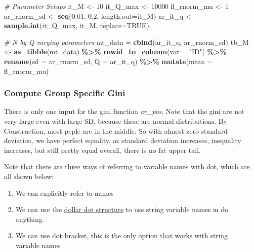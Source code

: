 \documentclass[
]{book}
\newenvironment{Shaded}{\begin{snugshade}}{\end{snugshade}}
\newcommand{\CommentTok}[1]{\textcolor[rgb]{0.56,0.35,0.01}{\textit{#1}}}
\newcommand{\DataTypeTok}[1]{\textcolor[rgb]{0.13,0.29,0.53}{#1}}
\newcommand{\DecValTok}[1]{\textcolor[rgb]{0.00,0.00,0.81}{#1}}
\newcommand{\FloatTok}[1]{\textcolor[rgb]{0.00,0.00,0.81}{#1}}
\newcommand{\KeywordTok}[1]{\textcolor[rgb]{0.13,0.29,0.53}{\textbf{#1}}}
\newcommand{\NormalTok}[1]{#1}
\newcommand{\OperatorTok}[1]{\textcolor[rgb]{0.81,0.36,0.00}{\textbf{#1}}}
\newcommand{\OtherTok}[1]{\textcolor[rgb]{0.56,0.35,0.01}{#1}}
\newcommand{\StringTok}[1]{\textcolor[rgb]{0.31,0.60,0.02}{#1}}
\providecommand{\tightlist}{%
  \setlength{\itemsep}{0pt}\setlength{\parskip}{0pt}}
\begin{document}
\begin{Shaded}
\begin{Highlighting}[]
\CommentTok{\# Parameter Setups}
\NormalTok{it\_M \textless{}{-}}\StringTok{ }\DecValTok{10}
\NormalTok{it\_Q\_max \textless{}{-}}\StringTok{ }\DecValTok{10000}
\NormalTok{fl\_rnorm\_mu \textless{}{-}}\StringTok{ }\DecValTok{1}
\NormalTok{ar\_rnorm\_sd \textless{}{-}}\StringTok{ }\KeywordTok{seq}\NormalTok{(}\FloatTok{0.01}\NormalTok{, }\FloatTok{0.2}\NormalTok{, }\DataTypeTok{length.out=}\NormalTok{it\_M)}
\NormalTok{ar\_it\_q \textless{}{-}}\StringTok{ }\KeywordTok{sample.int}\NormalTok{(it\_Q\_max, it\_M, }\DataTypeTok{replace=}\OtherTok{TRUE}\NormalTok{)}

\CommentTok{\# N by Q varying parameters}
\NormalTok{mt\_data =}\StringTok{ }\KeywordTok{cbind}\NormalTok{(ar\_it\_q, ar\_rnorm\_sd)}
\NormalTok{tb\_M \textless{}{-}}\StringTok{ }\KeywordTok{as\_tibble}\NormalTok{(mt\_data) }\OperatorTok{\%\textgreater{}\%}\StringTok{ }\KeywordTok{rowid\_to\_column}\NormalTok{(}\DataTypeTok{var =} \StringTok{"ID"}\NormalTok{) }\OperatorTok{\%\textgreater{}\%}
\StringTok{                }\KeywordTok{rename}\NormalTok{(}\DataTypeTok{sd =}\NormalTok{ ar\_rnorm\_sd, }\DataTypeTok{Q =}\NormalTok{ ar\_it\_q) }\OperatorTok{\%\textgreater{}\%}
\StringTok{                }\KeywordTok{mutate}\NormalTok{(}\DataTypeTok{mean =}\NormalTok{ fl\_rnorm\_mu)}
\end{Highlighting}
\end{Shaded}

\hypertarget{compute-group-specific-gini}{%
\subsubsection{Compute Group Specific Gini}\label{compute-group-specific-gini}}

There is only one input for the gini function \emph{ar\_pos}. Note that the gini are not very large even with large SD, because these are normal distributions. By Construction, most peple are in the middle. So with almost zero standard deviation, we have perfect equality, as standard deviation increases, inequality increases, but still pretty equal overall, there is no fat upper tail.

Note that there are three ways of referring to variable names with dot, which are all shown below:

\begin{enumerate}
\def\labelenumi{\arabic{enumi}.}
\tightlist
\item
  We can explicitly refer to names
\item
  We can use the \href{https://stackoverflow.com/a/18228613/8280804}{dollar dot structure} to use string variable names in do anything.
\item
  We can use dot bracket, this is the only option that works with string variable names
\end{enumerate}
\end{document}
